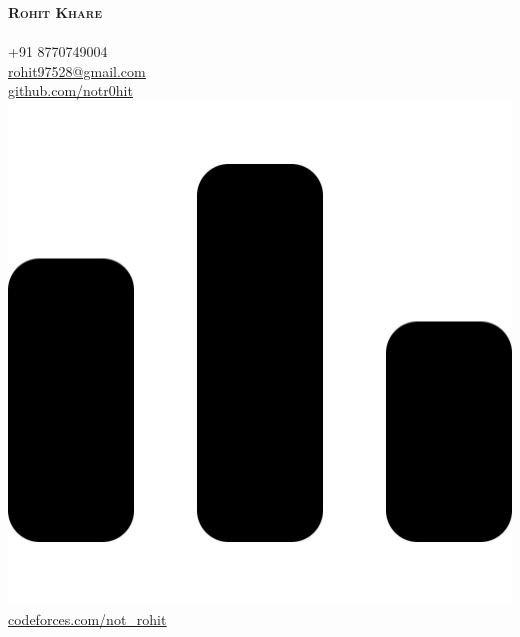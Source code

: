 \documentclass[A4,11pt]{article}
\begin{document}
\begin{minipage}[c]{0.4\textwidth}
    \textbf{\Huge \scshape{\hspace{3pt}Rohit Khare}} \\ \vspace{1pt} \\
    \hspace*{3pt}\small{\faPhone\hspace{2pt}+91 8770749004} \\ 
    \href{mailto:rohit97528@gmail.com}{\hspace{3pt}\faEnvelope\underline{ rohit97528@gmail.com}} \\
    \href{https://github.com/notr0hit}{\hspace{3pt}\faGithub \underline{ github.com/notr0hit}} \\
     \href{https://codeforces.com/profile/not_rohit}{\hspace{3pt}\includegraphics[scale=0.008]{components/codeforces.jpg} \underline{codeforces.com/not\_rohit}} 
    

\end{minipage}
\end{document}
